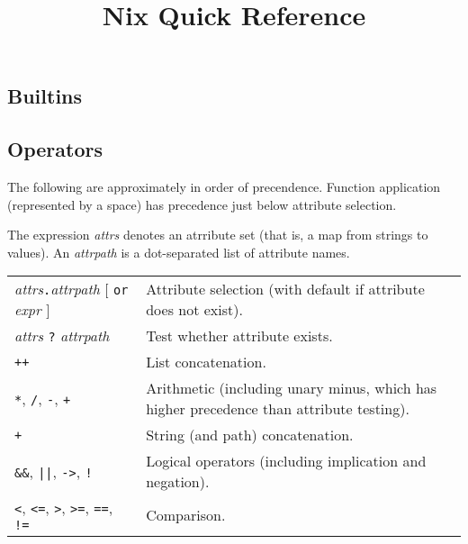 \documentclass[10pt, a4paper, landscape]{article}
\title{Nix Quick Reference}
\date{\vskip-10ex November 2023}
\newcommand{\cmd}[1]{\texttt{#1}}
\begin{document}
\begin{multicols*}{3}\raggedcolumns%
\maketitle

\section*{Builtins}

\subsection*{Operators}

The following are approximately in order of precendence. Function
application (represented by a space) has precedence just below
attribute selection.

The expression \emph{attrs} denotes an atrribute set (that is, a map
from strings to values). An \emph{attrpath} is a dot-separated list of
attribute names.

\begin{tabularx}{\columnwidth}{@{}l>{\raggedright\arraybackslash}X@{}}

  \parbox[t]{8em}{\emph{attrs}\texttt{.}\emph{attrpath} \\
    $[$ \texttt{or} \emph{expr} $]$}
  & Attribute selection (with default if attribute does not exist). \\

  \emph{attrs} \texttt{?} \emph{attrpath} & Test whether attribute
  exists. \\

  \cmd{++} & List concatenation. \\
  
  \cmd{*}, \cmd{/}, \cmd{-}, \cmd{+} & Arithmetic (including unary
  minus, which has higher precedence than attribute testing). \\
  
  \cmd{+} & String (and path) concatenation. \\
  
  \cmd{\&\&}, \cmd{||}, \cmd{->}, \cmd{!} & Logical operators
  (including implication and negation). \\
  
  \cmd{<}, \cmd{<=}, \cmd{>}, \cmd{>=}, \cmd{==}, \cmd{!=} &
  Comparison.
\end{tabularx}


\end{multicols*}
\end{document}
